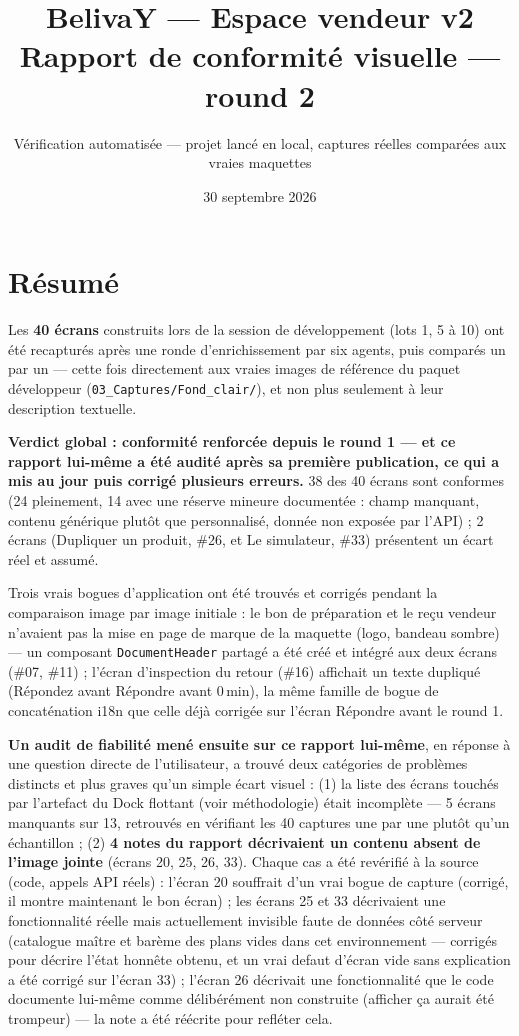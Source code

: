 \documentclass[11pt]{article}
\title{\textbf{\color{belivayorange} BelivaY — Espace vendeur v2} \\[4pt] \large Rapport de conformité visuelle — round 2}
\author{Vérification automatisée — projet lancé en local, captures réelles comparées aux vraies maquettes}
\date{30 septembre 2026}
\begin{document}
\maketitle

\section*{Résumé}
Les \textbf{40 écrans} construits lors de la session de développement (lots 1, 5 à 10) ont été recapturés après une ronde d'enrichissement par six agents, puis comparés un par un — cette fois directement aux vraies images de référence du paquet développeur (\texttt{03\_Captures/Fond\_clair/}), et non plus seulement à leur description textuelle.

\textbf{Verdict global : conformité renforcée depuis le round 1 — et ce rapport lui-même a été audité après sa première publication, ce qui a mis au jour puis corrigé plusieurs erreurs.} 38 des 40 écrans sont conformes (24 pleinement, 14 avec une réserve mineure documentée : champ manquant, contenu générique plutôt que personnalisé, donnée non exposée par l'API) ; 2 écrans (\og Dupliquer un produit\fg{}, \#26, et \og Le simulateur\fg{}, \#33) présentent un écart réel et assumé.

Trois vrais bogues d'application ont été trouvés et corrigés pendant la comparaison image par image initiale : le bon de préparation et le reçu vendeur n'avaient pas la mise en page de marque de la maquette (logo, bandeau sombre) — un composant \texttt{DocumentHeader} partagé a été créé et intégré aux deux écrans (\#07, \#11) ; l'écran d'inspection du retour (\#16) affichait un texte dupliqué (\og Répondez avant Répondre avant 0\,min\fg{}), la même famille de bogue de concaténation i18n que celle déjà corrigée sur l'écran Répondre avant le round 1.

\textbf{Un audit de fiabilité mené ensuite sur ce rapport lui-même}, en réponse à une question directe de l'utilisateur, a trouvé deux catégories de problèmes distincts et plus graves qu'un simple écart visuel : (1) la liste des écrans touchés par l'artefact du Dock flottant (voir méthodologie) était incomplète — 5 écrans manquants sur 13, retrouvés en vérifiant les 40 captures une par une plutôt qu'un échantillon ; (2) \textbf{4 notes du rapport décrivaient un contenu absent de l'image jointe} (écrans 20, 25, 26, 33). Chaque cas a été revérifié à la source (code, appels API réels) : l'écran 20 souffrait d'un vrai bogue de capture (corrigé, il montre maintenant le bon écran) ; les écrans 25 et 33 décrivaient une fonctionnalité réelle mais actuellement invisible faute de données côté serveur (catalogue maître et barème des plans vides dans cet environnement — corrigés pour décrire l'état honnête obtenu, et un vrai defaut d'écran vide sans explication a été corrigé sur l'écran 33) ; l'écran 26 décrivait une fonctionnalité que le code documente lui-même comme délibérément non construite (\og afficher ça aurait été trompeur\fg{}) — la note a été réécrite pour refléter cela.
\end{document}
